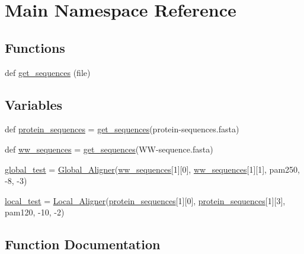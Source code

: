 \hypertarget{namespace_main}{}\section{Main Namespace Reference}
\label{namespace_main}
\subsection*{Functions}
\begin{DoxyCompactItemize}
\item 
def \hyperlink{namespace_main_a5e2b1a2a697c8ff97fe0508423af05f2}{get\+\_\+sequences} (file)
\end{DoxyCompactItemize}
\subsection*{Variables}
\begin{DoxyCompactItemize}
\item 
def \hyperlink{namespace_main_a0f7dfdcfc82e28e54d2d9b4355d51c6a}{protein\+\_\+sequences} = \hyperlink{namespace_main_a5e2b1a2a697c8ff97fe0508423af05f2}{get\+\_\+sequences}(\textquotesingle{}protein-\/sequences.\+fasta\textquotesingle{})
\item 
def \hyperlink{namespace_main_ad0e687821118d10a87cd81cdb0597636}{ww\+\_\+sequences} = \hyperlink{namespace_main_a5e2b1a2a697c8ff97fe0508423af05f2}{get\+\_\+sequences}(\textquotesingle{}WW-\/sequence.\+fasta\textquotesingle{})
\item 
\hyperlink{namespace_main_a027017501a6249c536a21b55ab4ff57d}{global\+\_\+test} = \hyperlink{class_aligners_1_1_global___aligner}{Global\+\_\+\+Aligner}(\hyperlink{namespace_main_ad0e687821118d10a87cd81cdb0597636}{ww\+\_\+sequences}\mbox{[}1\mbox{]}\mbox{[}0\mbox{]}, \hyperlink{namespace_main_ad0e687821118d10a87cd81cdb0597636}{ww\+\_\+sequences}\mbox{[}1\mbox{]}\mbox{[}1\mbox{]}, pam250, -\/8, -\/3)
\item 
\hyperlink{namespace_main_a855511465ef4b71860406d664b6b7f61}{local\+\_\+test} = \hyperlink{class_aligners_1_1_local___aligner}{Local\+\_\+\+Aligner}(\hyperlink{namespace_main_a0f7dfdcfc82e28e54d2d9b4355d51c6a}{protein\+\_\+sequences}\mbox{[}1\mbox{]}\mbox{[}0\mbox{]}, \hyperlink{namespace_main_a0f7dfdcfc82e28e54d2d9b4355d51c6a}{protein\+\_\+sequences}\mbox{[}1\mbox{]}\mbox{[}3\mbox{]}, pam120, -\/10, -\/2)
\end{DoxyCompactItemize}


\subsection{Function Documentation}
\mbox{\label{namespace_main_a5e2b1a2a697c8ff97fe0508423af05f2}} 
